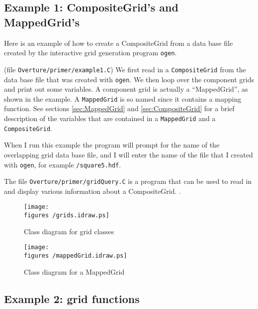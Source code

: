 \documentclass{article}
\begin{document}
\subsection{Example 1: CompositeGrid's and MappedGrid's}

Here is an example of how to create a CompositeGrid from 
a data base file created by the interactive grid generation program {\tt ogen}.

(file {\tt Overture/primer/example1.C})
{\footnotesize
{}
}
We first read in a {\tt CompositeGrid} from the data base file that was created
with {\tt ogen}.
We then loop over the component grids
and print out some variables.
A component grid is actually a ``MappedGrid'', as shown
in the example. A {\tt MappedGrid} is so named since it contains
a mapping function. See sections \ref{sec:MappedGrid} and \ref{sec:CompositeGrid}
for  a brief description of the variables that are contained 
in a {\tt MappedGrid} and a {\tt CompositeGrid}.

When I run this example the program will prompt for the name of the
overlapping grid data base file, and I will enter the name of the file
that I created with {\tt ogen}, for example {\tt \cgsh/square5.hdf}.

The file {\tt Overture/primer/gridQuery.C} is a program that can be used to read in
and display various information about a CompositeGrid.
.

\begin{figure} 
  \begin{center}
  \texttt{[image: \\figures /grids.idraw.ps]}
  \caption{Class diagram for grid classes} \label{fig:grids}
  \end{center}
\end{figure}

\begin{figure} 
  \begin{center}
  \texttt{[image: \\figures /mappedGrid.idraw.ps]}
  \caption{Class diagram for a MappedGrid}\label{fig:mappedGrid}
  \end{center}
\end{figure}

\vfill\eject
\subsection{Example 2: grid functions}
\end{document}
